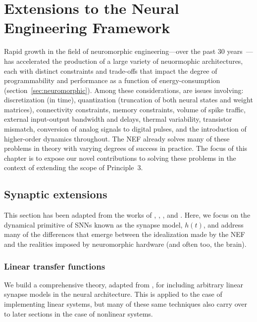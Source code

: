 \chapter{Extensions to the Neural Engineering Framework}
\label{chapt:nef-extensions}

Rapid growth in the field of neuromorphic engineering---over the past 30 years~\citep{mead1988silicon}---has accelerated the production of a large variety of neuormophic architectures, each with distinct constraints and trade-offs that impact the degree of programmability and performance as a function of energy-consumption (section~\ref{sec:neuromorphic}).
Among these considerations, are issues involving:
discretization (in time), quantization (truncation of both neural states and weight matrices), connectivity constraints, memory constraints, volume of spike traffic, external input-output bandwidth and delays, thermal variability, transistor mismatch, conversion of analog signals to digital pulses, and the introduction of higher-order dynamics throughout.
The NEF already solves many of these problems in theory with varying degrees of success in practice.
The focus of this chapter is to expose our novel contributions to solving these problems in the context of extending the scope of Principle~3.

\section{Synaptic extensions}
\label{sec:synaptic-extensions}

This section has been adapted from the works of \citet[][patent pending]{dynamicspatent}, \citet{voelker2017iscas}, \citet{voelker2017neuromorphic}, and \citet{voelker2018}.
Here, we focus on the dynamical primitive of SNNs known as the synapse model, $h(t)$, and address many of the differences that emerge between the idealization made by the NEF and the realities imposed by neuromorphic hardware (and often too, the brain).

\subsection{Linear transfer functions}
\label{sec:linear-extensions}

We build a comprehensive theory, adapted from \citet{voelker2018}, for including arbitrary linear synapse models in the neural architecture.
This is applied to the case of implementing linear systems, but many of these same techniques also carry over to later sections in the case of nonlinear systems. %

